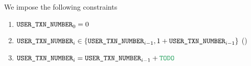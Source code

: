 We impose the following constraints
\begin{enumerate}
    \item $\texttt{USER}\texttt{\_}\texttt{TXN\_NUMBER} _{0} = 0$
    \item $\texttt{USER}\texttt{\_}\texttt{TXN\_NUMBER} _{i} \in \{ \texttt{USER}\texttt{\_}\texttt{TXN\_NUMBER} _{i - 1}, 1 + \texttt{USER}\texttt{\_}\texttt{TXN\_NUMBER} _{i - 1} \}$ \quad (\sanityCheck)
    \item $\userTransactionNumber _{i} = \userTransactionNumber _{i - 1} + \loc{TODO}$
\end{enumerate}
